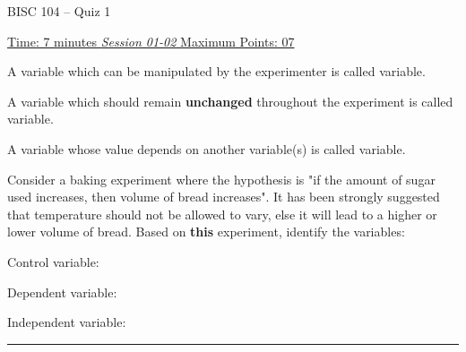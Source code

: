 \documentclass[11pt,paper=a4,answers]{exam}
\begin{document}

\noindent
\begin{minipage}[l]{.1\textwidth}%
\noindent
\end{minipage}
\hfill
\begin{minipage}[r]{\textwidth}%
\begin{center}
{%
\large BISC 104 -- Quiz 1\\[2pt]} %
\end{center}
\end{minipage}
\par
\noindent
\uline{Time: 7 minutes   \hfill \normalsize\emph{\underline{Session 01-02}} \hfill        Maximum Points: 07}
\begin{questions}

\pointsinrightmargin
\pointsdroppedatright
\marksnotpoints
\pointformat{\boldmath\themarginpoints}
\bracketedpoints
\question[01]
\label{Q:perunit}
A variable which can be manipulated by the experimenter is called \underline{\hspace{3cm}} variable.
\droppoints

\question[01]
A variable which should remain \textbf{unchanged} throughout the experiment is called \underline{\hspace{3cm}} variable.
\droppoints

\question[01]
A variable whose value depends on another variable(s) is called \underline{\hspace{3cm}} variable.
\droppoints

\vspace*{12pt}
Consider a baking experiment where the hypothesis is "if the amount of sugar used increases, then volume of bread increases". It has been strongly suggested that temperature should not be allowed to vary, else it will lead to a higher or lower volume of bread. Based on \textbf{this} experiment, identify the variables:

\question[02]
Control variable: \underline{\hspace{5cm}}
\droppoints

\question[01]
Dependent variable: \underline{\hspace{5cm}}
\droppoints

\question[01]
Independent variable: \underline{\hspace{5cm}}
\droppoints


 
\end{questions}
\begin{center}
\rule{.5\textwidth}{1pt}
\end{center}
\end{document}
